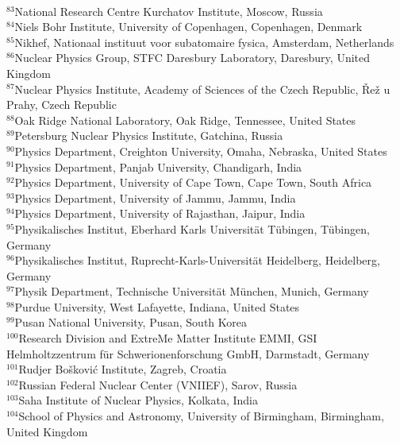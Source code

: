 \begin{flushleft}
\\
$^{83}$National Research Centre Kurchatov Institute, Moscow, Russia
\\
$^{84}$Niels Bohr Institute, University of Copenhagen, Copenhagen, Denmark
\\
$^{85}$Nikhef, Nationaal instituut voor subatomaire fysica, Amsterdam, Netherlands
\\
$^{86}$Nuclear Physics Group, STFC Daresbury Laboratory, Daresbury, United Kingdom
\\
$^{87}$Nuclear Physics Institute, Academy of Sciences of the Czech Republic, \v{R}e\v{z} u Prahy, Czech Republic
\\
$^{88}$Oak Ridge National Laboratory, Oak Ridge, Tennessee, United States
\\
$^{89}$Petersburg Nuclear Physics Institute, Gatchina, Russia
\\
$^{90}$Physics Department, Creighton University, Omaha, Nebraska, United States
\\
$^{91}$Physics Department, Panjab University, Chandigarh, India
\\
$^{92}$Physics Department, University of Cape Town, Cape Town, South Africa
\\
$^{93}$Physics Department, University of Jammu, Jammu, India
\\
$^{94}$Physics Department, University of Rajasthan, Jaipur, India
\\
$^{95}$Physikalisches Institut, Eberhard Karls Universit\"{a}t T\"{u}bingen, T\"{u}bingen, Germany
\\
$^{96}$Physikalisches Institut, Ruprecht-Karls-Universit\"{a}t Heidelberg, Heidelberg, Germany
\\
$^{97}$Physik Department, Technische Universit\"{a}t M\"{u}nchen, Munich, Germany
\\
$^{98}$Purdue University, West Lafayette, Indiana, United States
\\
$^{99}$Pusan National University, Pusan, South Korea
\\
$^{100}$Research Division and ExtreMe Matter Institute EMMI, GSI Helmholtzzentrum f\"ur Schwerionenforschung GmbH, Darmstadt, Germany
\\
$^{101}$Rudjer Bo\v{s}kovi\'{c} Institute, Zagreb, Croatia
\\
$^{102}$Russian Federal Nuclear Center (VNIIEF), Sarov, Russia
\\
$^{103}$Saha Institute of Nuclear Physics, Kolkata, India
\\
$^{104}$School of Physics and Astronomy, University of Birmingham, Birmingham, United Kingdom

\end{flushleft}
